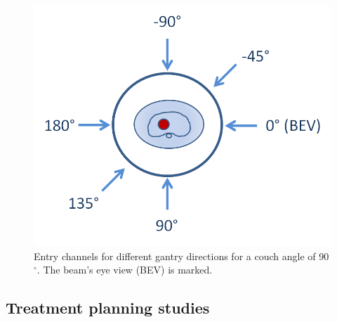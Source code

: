\begin{figure}[H]
 \begin{center}
  \includegraphics[scale=0.4]{./teile/results_human/GantryDirection_BEV.png}
  \caption{Entry channels for different gantry directions for a couch angle of 90$^{\circ}$. The beam's eye view (BEV) is marked.}
  \label{gantrydirection}
 \end{center}
\end{figure}


\newpage


\subsection{Treatment planning studies}

